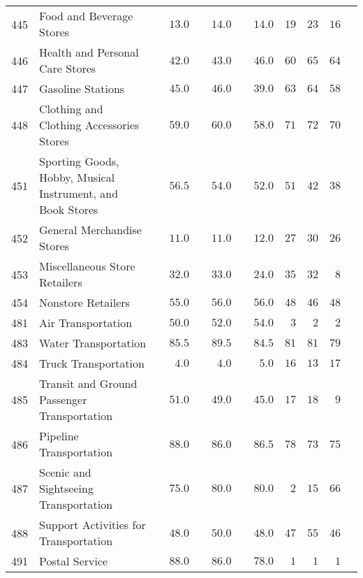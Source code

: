 \documentclass[9pt, oneside]{article}   	%
\begin{document}
\begin{longtable}{lp{3 in}ccccccc}
445  & Food and Beverage Stores & $\phantom{00}13.0$ & $\phantom{00}14.0$ & $\phantom{00}14.0$ & $19$ & $23$ & $16$ \\
446  & Health and Personal Care Stores & $\phantom{00}42.0$ & $\phantom{00}43.0$ & $\phantom{00}46.0$ & $60$ & $65$ & $64$ \\
447  & Gasoline Stations & $\phantom{00}45.0$ & $\phantom{00}46.0$ & $\phantom{00}39.0$ & $63$ & $64$ & $58$ \\
448  & Clothing and Clothing Accessories Stores & $\phantom{00}59.0$ & $\phantom{00}60.0$ & $\phantom{00}58.0$ & $71$ & $72$ & $70$ \\
451  & Sporting Goods, Hobby, Musical Instrument, and Book Stores & $\phantom{00}56.5$ & $\phantom{00}54.0$ & $\phantom{00}52.0$ & $51$ & $42$ & $38$ \\
452  & General Merchandise Stores & $\phantom{00}11.0$ & $\phantom{00}11.0$ & $\phantom{00}12.0$ & $27$ & $30$ & $26$ \\
453  & Miscellaneous Store Retailers & $\phantom{00}32.0$ & $\phantom{00}33.0$ & $\phantom{00}24.0$ & $35$ & $32$ & $\phantom{0}8$ \\
454  & Nonstore Retailers & $\phantom{00}55.0$ & $\phantom{00}56.0$ & $\phantom{00}56.0$ & $48$ & $46$ & $48$ \\
481  & Air Transportation & $\phantom{00}50.0$ & $\phantom{00}52.0$ & $\phantom{00}54.0$ & $\phantom{0}3$ & $\phantom{0}2$ & $\phantom{0}2$ \\
483  & Water Transportation & $\phantom{00}85.5$ & $\phantom{00}89.5$ & $\phantom{00}84.5$ & $81$ & $81$ & $79$ \\
484  & Truck Transportation & $\phantom{000}4.0$ & $\phantom{000}4.0$ & $\phantom{000}5.0$ & $16$ & $13$ & $17$ \\
485  & Transit and Ground Passenger Transportation & $\phantom{00}51.0$ & $\phantom{00}49.0$ & $\phantom{00}45.0$ & $17$ & $18$ & $\phantom{0}9$ \\
486  & Pipeline Transportation & $\phantom{00}88.0$ & $\phantom{00}86.0$ & $\phantom{00}86.5$ & $78$ & $73$ & $75$ \\
487  & Scenic and Sightseeing Transportation & $\phantom{00}75.0$ & $\phantom{00}80.0$ & $\phantom{00}80.0$ & $\phantom{0}2$ & $15$ & $66$ \\
488  & Support Activities for Transportation & $\phantom{00}48.0$ & $\phantom{00}50.0$ & $\phantom{00}48.0$ & $47$ & $55$ & $46$ \\
491  & Postal Service & $\phantom{00}88.0$ & $\phantom{00}86.0$ & $\phantom{00}78.0$ & $\phantom{0}1$ & $\phantom{0}1$ & $\phantom{0}1$ \\

\end{longtable}
\end{document}
